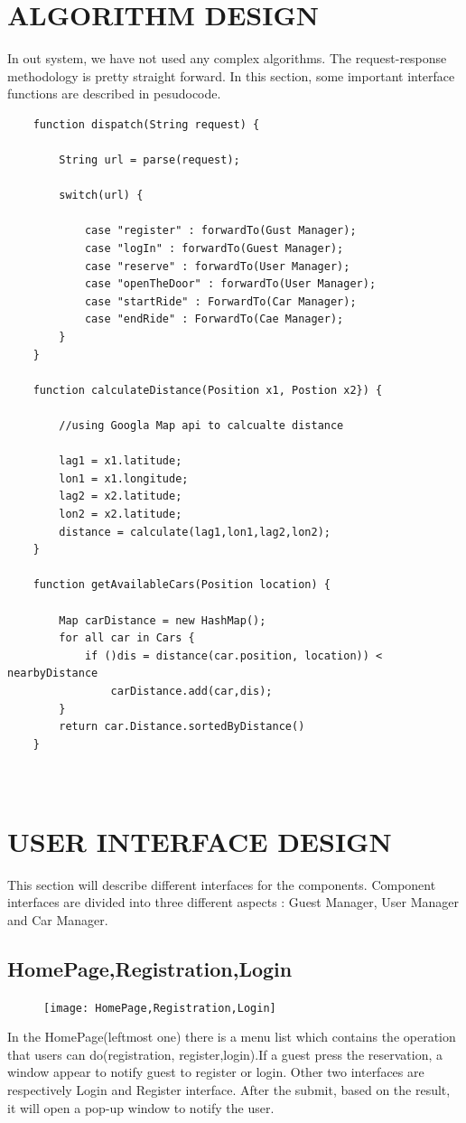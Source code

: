 \documentclass{article}
\begin{document}
	\section{ALGORITHM DESIGN}
	In out system, we have not used any complex algorithms. The request-response methodology is pretty straight forward. In this section, some important interface functions  are described in pesudocode.
	\begin{verbatim}
	function dispatch(String request) {
	
		String url = parse(request);
	
		switch(url) {
	
			case "register" : forwardTo(Gust Manager);	
			case "logIn" : forwardTo(Guest Manager);	
			case "reserve" : forwardTo(User Manager);	
			case "openTheDoor" : forwardTo(User Manager);	
			case "startRide" : ForwardTo(Car Manager);
			case "endRide" : ForwardTo(Cae Manager); 
		}
	}
	
	function calculateDistance(Position x1, Postion x2}) {
		
		//using Googla Map api to calcualte distance
		
		lag1 = x1.latitude;
		lon1 = x1.longitude;
		lag2 = x2.latitude;
		lon2 = x2.latitude;
		distance = calculate(lag1,lon1,lag2,lon2);
	}
	
	function getAvailableCars(Position location) {
		
		Map carDistance = new HashMap();
		for all car in Cars {
			if ()dis = distance(car.position, location)) < nearbyDistance 
				carDistance.add(car,dis);
		}
		return car.Distance.sortedByDistance()
	}
	
	
	\end{verbatim}
	
	\section{USER INTERFACE DESIGN}
	This section will describe different interfaces for the components. Component interfaces are divided into three different aspects : Guest Manager, User Manager and Car Manager.
	\subsection{HomePage,Registration,Login}
	\begin{figure}[!htb]
		\texttt{[image: HomePage,Registration,Login]} 
	\end{figure}
	In the HomePage(leftmost one) there is a menu list which contains the operation that users can do(registration, register,login).If a guest press the reservation, a window appear to notify guest to register or login. Other two interfaces are respectively Login and Register interface. After the submit, based on the result, it will open a pop-up window to notify the user.
	\newpage
\end{document}
